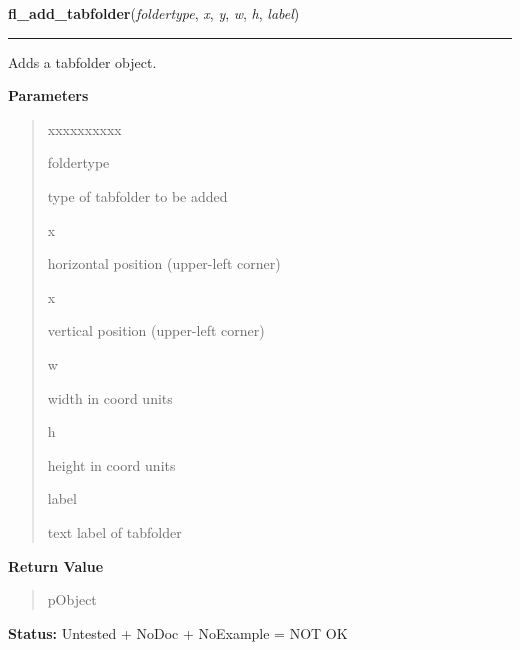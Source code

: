     \label{xformslib:library:fl_add_tabfolder}

    \vspace{0.5ex}

\hspace{.8\funcindent}\begin{boxedminipage}{\funcwidth}

    \raggedright \textbf{fl\_add\_tabfolder}(\textit{foldertype}, \textit{x}, \textit{y}, \textit{w}, \textit{h}, \textit{label})

    \vspace{-1.5ex}

    \rule{\textwidth}{0.5\fboxrule}
\setlength{\parskip}{2ex}
    Adds a tabfolder object.

\setlength{\parskip}{1ex}
      \textbf{Parameters}
      \vspace{-1ex}

      \begin{quote}
        \begin{Ventry}{xxxxxxxxxx}

          \item[foldertype]

          type of tabfolder to be added

          \item[x]

          horizontal position (upper-left corner)

          \item[x]

          vertical position (upper-left corner)

          \item[w]

          width in coord units

          \item[h]

          height in coord units

          \item[label]

          text label of tabfolder

        \end{Ventry}

      \end{quote}

      \textbf{Return Value}
    \vspace{-1ex}

      \begin{quote}
      pObject

      \end{quote}

\textbf{Status:} Untested + NoDoc + NoExample = NOT OK



    \end{boxedminipage}

